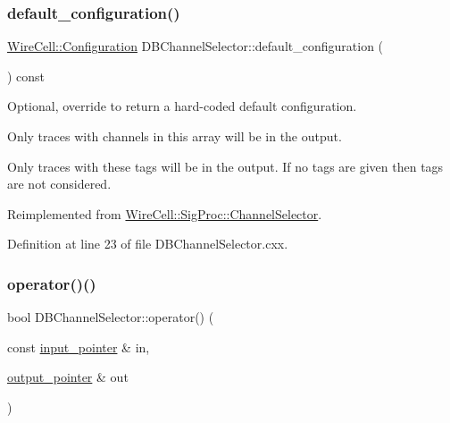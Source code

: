 \subsubsection{\texorpdfstring{default\+\_\+configuration()}{default\_configuration()}}
{\footnotesize\ttfamily \hyperlink{namespace_wire_cell_a9f705541fc1d46c608b3d32c182333ee}{Wire\+Cell\+::\+Configuration} D\+B\+Channel\+Selector\+::default\+\_\+configuration (\begin{DoxyParamCaption}{ }\end{DoxyParamCaption}) const\hspace{0.3cm}{\ttfamily [virtual]}}



Optional, override to return a hard-\/coded default configuration. 

Only traces with channels in this array will be in the output.

Only traces with these tags will be in the output. If no tags are given then tags are not considered. 

Reimplemented from \hyperlink{class_wire_cell_1_1_sig_proc_1_1_channel_selector_a4327241e133cc7aa3d336bec304cc568}{Wire\+Cell\+::\+Sig\+Proc\+::\+Channel\+Selector}.



Definition at line 23 of file D\+B\+Channel\+Selector.\+cxx.

\mbox{\label{class_wire_cell_1_1_sig_proc_1_1_d_b_channel_selector_aed483bbdb14a86719f307749becf7695}} 
\subsubsection{\texorpdfstring{operator()()}{operator()()}}
{\footnotesize\ttfamily bool D\+B\+Channel\+Selector\+::operator() (\begin{DoxyParamCaption}\item[{const \hyperlink{class_wire_cell_1_1_i_function_node_a55c0946156df9b712b8ad1a0b59b2db6}{input\+\_\+pointer} \&}]{in,  }\item[{\hyperlink{class_wire_cell_1_1_i_function_node_afc02f1ec60d31aacddf64963f9ca650b}{output\+\_\+pointer} \&}]{out }\end{DoxyParamCaption})\hspace{0.3cm}{\ttfamily [virtual]}}



